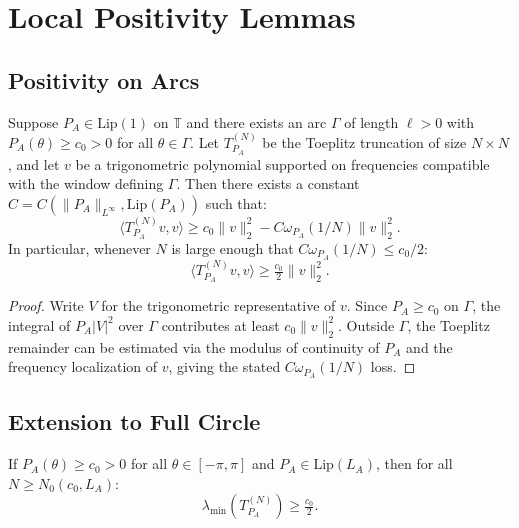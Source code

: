 \section{Local Positivity Lemmas}\label{app:local-positivity}

\subsection{Positivity on Arcs}

\begin{lemma}\label{lem:local-pos}
Suppose $P_A \in \mathrm{Lip}(1)$ on $\mathbb{T}$ and there exists an arc $\Gamma$ of length $\ell > 0$ with $P_A(\theta) \geq c_0 > 0$ for all $\theta \in \Gamma$. Let $T_{P_A}^{(N)}$ be the Toeplitz truncation of size $N \times N$, and let $v$ be a trigonometric polynomial supported on frequencies compatible with the window defining $\Gamma$. Then there exists a constant $C = C(\|P_A\|_{L^\infty}, \mathrm{Lip}(P_A))$ such that:
\begin{equation}
  \langle T_{P_A}^{(N)} v, v \rangle \geq c_0 \|v\|_2^2 - C \omega_{P_A}(1/N) \|v\|_2^2.
\end{equation}
In particular, whenever $N$ is large enough that $C \omega_{P_A}(1/N) \leq c_0/2$:
\begin{equation}
  \langle T_{P_A}^{(N)} v, v \rangle \geq \tfrac{c_0}{2} \|v\|_2^2.
\end{equation}
\end{lemma}

\begin{proof}
Write $V$ for the trigonometric representative of $v$. Since $P_A \geq c_0$ on $\Gamma$, the integral of $P_A |V|^2$ over $\Gamma$ contributes at least $c_0 \|v\|_2^2$. Outside $\Gamma$, the Toeplitz remainder can be estimated via the modulus of continuity of $P_A$ and the frequency localization of $v$, giving the stated $C \omega_{P_A}(1/N)$ loss.
\end{proof}

\subsection{Extension to Full Circle}

\begin{proposition}\label{prop:global-local}
If $P_A(\theta) \geq c_0 > 0$ for all $\theta \in [-\pi, \pi]$ and $P_A \in \mathrm{Lip}(L_A)$, then for all $N \geq N_0(c_0, L_A)$:
\begin{equation}
  \lambda_{\min}(T_{P_A}^{(N)}) \geq \tfrac{c_0}{2}.
\end{equation}
\end{proposition}

